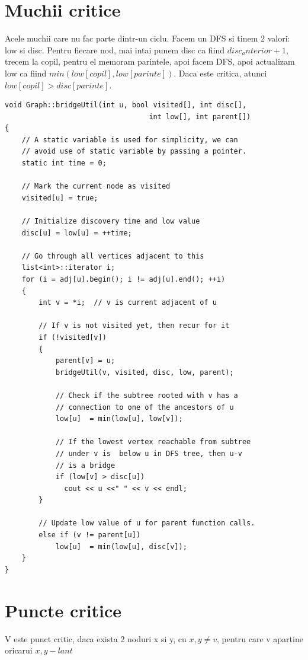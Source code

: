 \documentclass{article}
\begin{document}
    \section{Muchii critice} Acele muchii care nu fac parte dintr-un ciclu. Facem un DFS si tinem 2 valori: low si disc. Pentru fiecare nod, mai intai punem disc ca fiind $disc_anterior + 1$, trecem la copil, pentru el memoram parintele, apoi facem DFS, apoi actualizam low ca fiind $min(low[copil], low[parinte])$. Daca este critica, atunci $low[copil]>disc[parinte]$.
    \begin{lstlisting}
void Graph::bridgeUtil(int u, bool visited[], int disc[],
                                  int low[], int parent[])
{
    // A static variable is used for simplicity, we can
    // avoid use of static variable by passing a pointer.
    static int time = 0;
 
    // Mark the current node as visited
    visited[u] = true;
 
    // Initialize discovery time and low value
    disc[u] = low[u] = ++time;
 
    // Go through all vertices adjacent to this
    list<int>::iterator i;
    for (i = adj[u].begin(); i != adj[u].end(); ++i)
    {
        int v = *i;  // v is current adjacent of u
 
        // If v is not visited yet, then recur for it
        if (!visited[v])
        {
            parent[v] = u;
            bridgeUtil(v, visited, disc, low, parent);
 
            // Check if the subtree rooted with v has a
            // connection to one of the ancestors of u
            low[u]  = min(low[u], low[v]);
 
            // If the lowest vertex reachable from subtree
            // under v is  below u in DFS tree, then u-v
            // is a bridge
            if (low[v] > disc[u])
              cout << u <<" " << v << endl;
        }
 
        // Update low value of u for parent function calls.
        else if (v != parent[u])
            low[u]  = min(low[u], disc[v]);
    }
}
    \end{lstlisting}

    \section{Puncte critice} V este punct critic, daca exista 2 noduri x si y, cu $x,y \neq v$, pentru care v apartine oricarui $x,y-lant$
\end{document}
